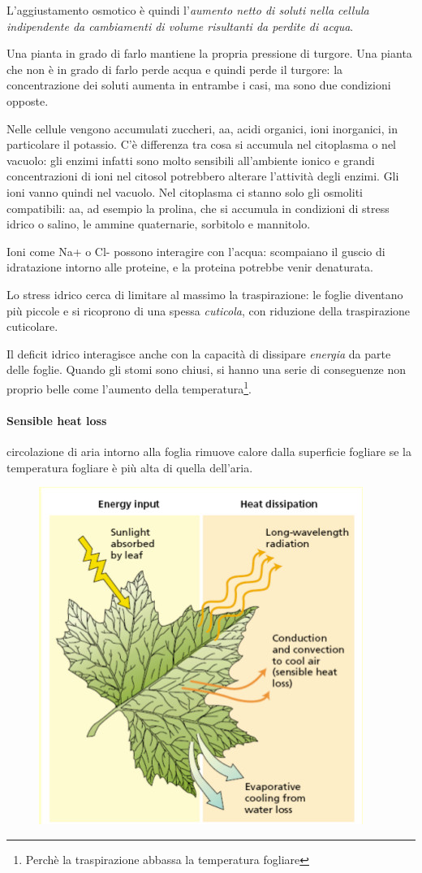 \documentclass[a4paper,12pt]{book}
\begin{document}
L'aggiustamento osmotico è quindi l'\emph{aumento
netto di soluti nella cellula indipendente
da cambiamenti di volume risultanti da
perdite di acqua}.

Una pianta in grado di farlo mantiene la propria pressione di turgore. Una pianta che non è in grado di farlo perde acqua e quindi perde il turgore: la concentrazione dei soluti aumenta in entrambe i casi, ma sono due condizioni opposte.

Nelle cellule vengono accumulati zuccheri, aa, acidi organici, ioni inorganici, in particolare il potassio. C'è differenza tra cosa si accumula nel citoplasma o nel vacuolo: gli enzimi infatti sono molto sensibili all'ambiente ionico e grandi concentrazioni di ioni nel citosol potrebbero alterare l'attività degli enzimi. Gli ioni vanno quindi nel vacuolo. Nel citoplasma ci stanno solo gli osmoliti compatibili: aa, ad esempio la prolina, che si accumula in condizioni di stress idrico o salino, le ammine quaternarie, sorbitolo e mannitolo.

Ioni come Na+ o Cl- possono interagire con l'acqua: scompaiano il guscio di idratazione intorno alle proteine, e la proteina potrebbe venir denaturata.

Lo stress idrico cerca di limitare al massimo la traspirazione: le foglie diventano più piccole e si ricoprono di una spessa \emph{cuticola}, con riduzione della traspirazione cuticolare.

Il deficit idrico interagisce anche con la capacità di dissipare \emph{energia} da parte delle foglie. Quando gli stomi sono chiusi, si hanno una serie di conseguenze non proprio belle come l'aumento della temperatura\footnote{Perchè la traspirazione abbassa la temperatura fogliare}. 

\paragraph{Sensible heat loss} circolazione di aria intorno alla foglia rimuove calore dalla superficie fogliare se la temperatura fogliare è più alta di quella dell'aria.
\begin{figure}[H]
\centering
\includegraphics[scale=.4]{immagini/heat.jpg}
\end{figure}
\end{document}
